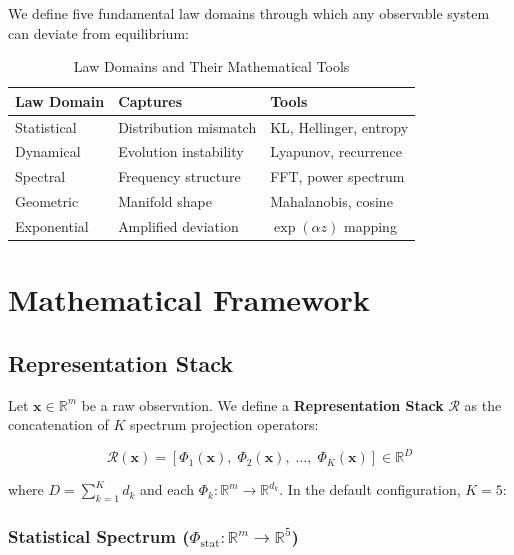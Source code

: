 \documentclass[journal]{IEEEtran}
\newcommand{\R}{\mathbb{R}}
\newcommand{\calR}{\mathcal{R}}
\begin{document}
We define five fundamental law domains through which any observable system can deviate from equilibrium:

\begin{table}[h]
\centering
\caption{Law Domains and Their Mathematical Tools}
\label{tab:laws}
\begin{tabular}{@{}lll@{}}
\toprule
\textbf{Law Domain} & \textbf{Captures} & \textbf{Tools} \\
\midrule
Statistical & Distribution mismatch & KL, Hellinger, entropy \\
Dynamical & Evolution instability & Lyapunov, recurrence \\
Spectral & Frequency structure & FFT, power spectrum \\
Geometric & Manifold shape & Mahalanobis, cosine \\
Exponential & Amplified deviation & $\exp(\alpha z)$ mapping \\
\bottomrule
\end{tabular}
\end{table}

\section{Mathematical Framework}
\label{sec:framework}

\subsection{Representation Stack}
\label{ssec:stack}

Let $\mathbf{x} \in \R^m$ be a raw observation. We define a \textbf{Representation Stack} $\calR$ as the concatenation of $K$ spectrum projection operators:

\begin{equation}
\calR(\mathbf{x}) = \left[\Phi_1(\mathbf{x}),\; \Phi_2(\mathbf{x}),\; \ldots,\; \Phi_K(\mathbf{x})\right] \in \R^D
\label{eq:stack}
\end{equation}

where $D = \sum_{k=1}^K d_k$ and each $\Phi_k: \R^m \to \R^{d_k}$. In the default configuration, $K = 5$:

\subsubsection{Statistical Spectrum ($\Phi_{\text{stat}}: \R^m \to \R^5$)}
\end{document}

